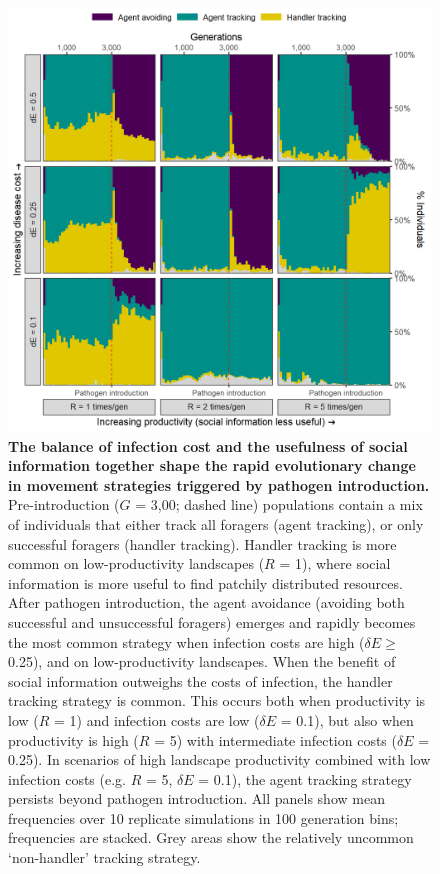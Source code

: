 \begin{figure}[!h]
    \centering
    \includegraphics[width=0.9\linewidth]{figures/pathomove/fig_05.png}
    \caption{
        \textbf{The balance of infection cost and the usefulness of social information together shape the rapid evolutionary change in movement strategies triggered by pathogen introduction.}
        Pre-introduction ($G$ = 3,00; dashed line) populations contain a mix of individuals that either track all foragers (agent tracking), or only successful foragers (handler tracking).
        Handler tracking is more common on low-productivity landscapes ($R$ = 1), where social information is more useful to find patchily distributed resources.
        After pathogen introduction, the agent avoidance (avoiding both successful and unsuccessful foragers) emerges and rapidly becomes the most common strategy when infection costs are high ($\delta E \geq$ 0.25), and on low-productivity landscapes.
        When the benefit of social information outweighs the costs of infection, the handler tracking strategy is common.
        This occurs both when productivity is low ($R$ = 1) and infection costs are low ($\delta E$ = 0.1), but also when productivity is high ($R$ = 5) with intermediate infection costs ($\delta E$ = 0.25).
        In scenarios of high landscape productivity combined with low infection costs (e.g. $R$ = 5, $\delta E$ = 0.1), the agent tracking strategy persists beyond pathogen introduction.
        All panels show mean frequencies over 10 replicate simulations in 100 generation bins; frequencies are stacked.
        Grey areas show the relatively uncommon `non-handler' tracking strategy.
    }\label{patho_fig_05}
\end{figure}


